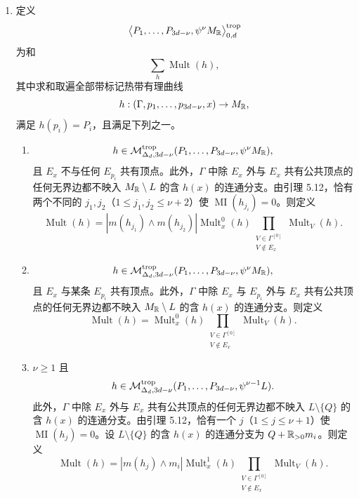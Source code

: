 \begin{definition}
\begin{enumerate}[label=(\arabic*),leftmargin=2.2em,itemsep=2pt]
\begin{enumerate}[label=(\alph*),leftmargin=2.2em,itemsep=2pt]
  \item $\nu\ge1$ 且
    \[
      h\in\cM^{\mathrm{trop}}_{\Delta_d,3d-1-\nu}(P_1,\ldots,P_{3d-1-\nu},\psi^{\nu-1}Q).
    \]
    则
    \[
      \operatorname{Mult}(h)=\operatorname{Mult}^1_x(h)
      \prod_{\substack{V\in\Gamma^{[0]}\\ V\notin E_x}}\operatorname{Mult}_V(h).
    \]
  \end{enumerate}
\item 定义
  \[
    \bigl\langle P_1,\ldots,P_{3d-\nu},\psi^\nu M_{\mathbb{R}}\bigr\rangle^{\mathrm{trop}}_{0,d}
  \]
  为和
  \[
    \sum_h\operatorname{Mult}(h),
  \]
  其中求和取遍全部带标记热带有理曲线
  \[
    h:(\Gamma,p_1,\ldots,p_{3d-\nu},x)\to M_{\mathbb{R}},
  \]
  满足 $h(p_i)=P_i$，且满足下列之一。
  \begin{enumerate}[label=(\alph*),leftmargin=2.2em,itemsep=2pt]
  \item
    \[
      h\in\mathcal{M}^{\mathrm{trop}}_{\Delta_d,3d-\nu}(P_1,\ldots,P_{3d-\nu},\psi^\nu M_{\mathbb{R}}),
    \]
    且 $E_x$ 不与任何 $E_{p_i}$ 共有顶点。此外，$\Gamma$ 中除 $E_x$ 外与 $E_x$ 共有公共顶点的任何无界边都不映入 $M_{\mathbb{R}}\setminus L$ 的含 $h(x)$ 的连通分支。由引理 5.12，恰有两个不同的 $j_1,j_2$（$1\le j_1,j_2\le\nu+2$）使 $\operatorname{MI}(h_{j_i})=0$。则定义
    \[
      \operatorname{Mult}(h)=|m(h_{j_1})\wedge m(h_{j_2})|\operatorname{Mult}^0_x(h)
      \prod_{\substack{V\in\Gamma^{[0]}\\ V\notin E_x}}\operatorname{Mult}_V(h).
    \]
  \item
    \[
      h\in\mathcal{M}^{\mathrm{trop}}_{\Delta_d,3d-\nu}(P_1,\ldots,P_{3d-\nu},\psi^\nu M_{\mathbb{R}}),
    \]
    且 $E_x$ 与某条 $E_{p_i}$ 共有顶点。此外，$\Gamma$ 中除 $E_x$ 与 $E_{p_i}$ 外与 $E_x$ 共有公共顶点的任何无界边都不映入 $M_{\mathbb{R}}\setminus L$ 的含 $h(x)$ 的连通分支。则定义
    \[
      \operatorname{Mult}(h)=\operatorname{Mult}^0_x(h)
      \prod_{\substack{V\in\Gamma^{[0]}\\ V\notin E_x}}\operatorname{Mult}_V(h).
    \]
  \item $\nu\ge1$ 且
    \[
      h\in\mathcal{M}^{\mathrm{trop}}_{\Delta_d,3d-\nu}(P_1,\ldots,P_{3d-\nu},\psi^{\nu-1}L).
    \]
    此外，$\Gamma$ 中除 $E_x$ 外与 $E_x$ 共有公共顶点的任何无界边都不映入 $L\setminus\{Q\}$ 的含 $h(x)$ 的连通分支。由引理 5.12，恰有一个 $j$（$1\le j\le\nu+1$）使 $\operatorname{MI}(h_j)=0$。设 $L\setminus\{Q\}$ 的含 $h(x)$ 的连通分支为 $Q+\mathbb{R}_{>0}m_i$。则定义
    \[
      \operatorname{Mult}(h)=|m(h_j)\wedge m_i|\operatorname{Mult}^1_x(h)
      \prod_{\substack{V\in\Gamma^{[0]}\\ V\notin E_x}}\operatorname{Mult}_V(h).
    \]


\end{enumerate}
\end{enumerate}
\end{definition}
